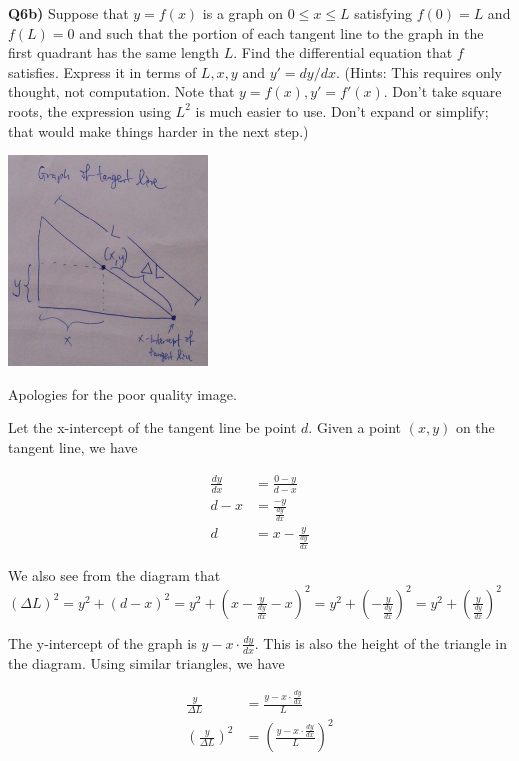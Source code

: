 \documentclass[9pt]{article}
\begin{document}
\begin{tcolorbox}
  \textbf{Q6b)} Suppose that $y = f(x)$ is a graph on $0 \leq x \leq L$ satisfying $f(0) = L$ and $f(L) = 0$ and such that the portion of each tangent line to the graph in the first quadrant has the same length $L$. Find the differential equation that $f$ satisfies. Express it in terms of $L, x, y$ and $y' = dy/dx$. (Hints: This requires only thought, not computation. Note that $y = f(x), y' = f'(x)$. Don't take square roots, the expression using $L^2$ is much easier to use. Don't expand or simplify; that would make things harder in the next step.)
\end{tcolorbox}

\begin{center}
  \includegraphics[]{q6b.jpg}
\end{center}

Apologies for the poor quality image.

Let the x-intercept of the tangent line be point $d$. Given a point $(x, y)$ on the tangent line, we have

\begin{align*}
  \frac{dy}{dx} &= \frac{0 - y}{d - x}\\
  d - x &= \frac{-y}{\frac{dy}{dx}}\\
  d &= x - \frac{y}{\frac{dy}{dx}}
\end{align*}

We also see from the diagram that $(\Delta L)^2 = y^2 + (d - x)^2 = y^2 + (x - \frac{y}{\frac{dy}{dx}} - x)^2 = y^2 + (-\frac{y}{\frac{dy}{dx}})^2 = y^2 + (\frac{y}{\frac{dy}{dx}})^2$

The y-intercept of the graph is $y - x \cdot \frac{dy}{dx}$. This is also the height of the triangle in the diagram. Using similar triangles, we have

\begin{align*}
  \frac{y}{\Delta L} &= \frac{y - x \cdot \frac{dy}{dx}}{L}\\
  (\frac{y}{\Delta L})^2 &= (\frac{y - x \cdot \frac{dy}{dx}}{L})^2
\end{align*}
\end{document}
